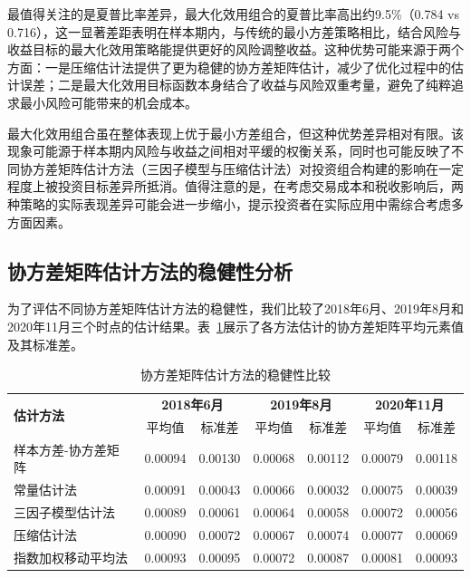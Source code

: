 \documentclass[12pt, a4paper]{article}
\begin{document}
最值得关注的是夏普比率差异，最大化效用组合的夏普比率高出约9.5\%（0.784 vs 0.716），这一显著差距表明在样本期内，与传统的最小方差策略相比，结合风险与收益目标的最大化效用策略能提供更好的风险调整收益。这种优势可能来源于两个方面：一是压缩估计法提供了更为稳健的协方差矩阵估计，减少了优化过程中的估计误差；二是最大化效用目标函数本身结合了收益与风险双重考量，避免了纯粹追求最小风险可能带来的机会成本。

最大化效用组合虽在整体表现上优于最小方差组合，但这种优势差异相对有限。该现象可能源于样本期内风险与收益之间相对平缓的权衡关系，同时也可能反映了不同协方差矩阵估计方法（三因子模型与压缩估计法）对投资组合构建的影响在一定程度上被投资目标差异所抵消。值得注意的是，在考虑交易成本和税收影响后，两种策略的实际表现差异可能会进一步缩小，提示投资者在实际应用中需综合考虑多方面因素。

\subsection{协方差矩阵估计方法的稳健性分析}

为了评估不同协方差矩阵估计方法的稳健性，我们比较了2018年6月、2019年8月和2020年11月三个时点的估计结果。表~\ref{tab:cov_stability}展示了各方法估计的协方差矩阵平均元素值及其标准差。

\begin{table}[htbp]
\centering
\caption{协方差矩阵估计方法的稳健性比较}
\label{tab:cov_stability}
\begin{tabular}{lcccccc}
\toprule
\multirow{2}{*}{\textbf{估计方法}} & \multicolumn{2}{c}{\textbf{2018年6月}} & \multicolumn{2}{c}{\textbf{2019年8月}} & \multicolumn{2}{c}{\textbf{2020年11月}} \\
\cmidrule(lr){2-3} \cmidrule(lr){4-5} \cmidrule(lr){6-7}
 & 平均值 & 标准差 & 平均值 & 标准差 & 平均值 & 标准差 \\
\midrule
样本方差-协方差矩阵 & 0.00094 & 0.00130 & 0.00068 & 0.00112 & 0.00079 & 0.00118 \\
常量估计法 & 0.00091 & 0.00043 & 0.00066 & 0.00032 & 0.00075 & 0.00039 \\
三因子模型估计法 & 0.00089 & 0.00061 & 0.00064 & 0.00058 & 0.00072 & 0.00056 \\
压缩估计法 & 0.00090 & 0.00072 & 0.00067 & 0.00074 & 0.00077 & 0.00069 \\
指数加权移动平均法 & 0.00093 & 0.00095 & 0.00072 & 0.00087 & 0.00081 & 0.00093 \\
\bottomrule
\end{tabular}
\end{table}
\end{document}
